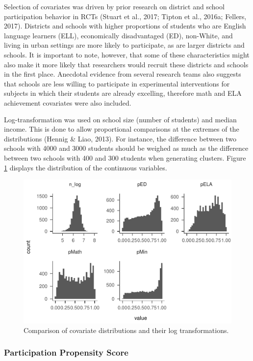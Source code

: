 \documentclass[man,floatsintext]{apa6}
\theoremstyle{definition}
\theoremstyle{definition}
\theoremstyle{definition}
\theoremstyle{remark}
\begin{document}
Selection of covariates was driven by prior research on district and
school participation behavior in RCTs (Stuart et al., 2017; Tipton et
al., 2016a; Fellers, 2017). Districts and schools with higher
proportions of students who are English language learners (ELL),
economically disadvantaged (ED), non-White, and living in urban settings
are more likely to participate, as are larger districts and schools. It
is important to note, however, that some of these characteristics might
also make it more likely that researchers would recruit these districts
and schools in the first place. Anecdotal evidence from several research
teams also suggests that schools are less willing to participate in
experimental interventions for subjects in which their students are
already excelling, therefore math and ELA achievement covariates were
also included.

Log-transformation was used on school size (number of students) and
median income. This is done to allow proportional comparisons at the
extremes of the distributions (Hennig \& Liao, 2013). For instance, the
difference between two schools with 4000 and 3000 students should be
weighed as much as the difference between two schools with 400 and 300
students when generating clusters. Figure \ref{fig:plot-dist1} displays
the distribution of the continuous variables.

\begin{figure}
\centering
\includegraphics{GenSamp_Paper_files/figure-latex/plot-dist1-1.pdf}
\caption{\label{fig:plot-dist1}Comparison of covariate distributions and
their log transformations.}
\end{figure}

\hypertarget{participation-propensity-score}{%
\subsubsection{Participation Propensity
Score}\label{participation-propensity-score}}
\end{document}
